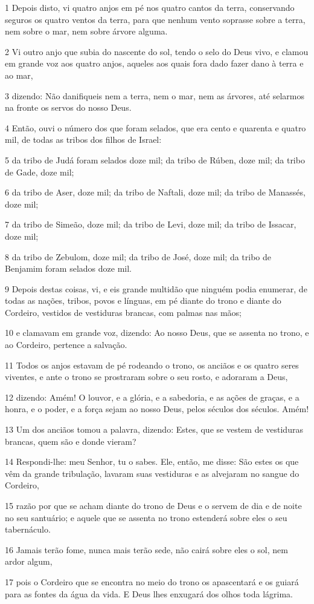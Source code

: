 \par 1 Depois disto, vi quatro anjos em pé nos quatro cantos da terra, conservando seguros os quatro ventos da terra, para que nenhum vento soprasse sobre a terra, nem sobre o mar, nem sobre árvore alguma.
\par 2 Vi outro anjo que subia do nascente do sol, tendo o selo do Deus vivo, e clamou em grande voz aos quatro anjos, aqueles aos quais fora dado fazer dano à terra e ao mar,
\par 3 dizendo: Não danifiqueis nem a terra, nem o mar, nem as árvores, até selarmos na fronte os servos do nosso Deus.
\par 4 Então, ouvi o número dos que foram selados, que era cento e quarenta e quatro mil, de todas as tribos dos filhos de Israel:
\par 5 da tribo de Judá foram selados doze mil; da tribo de Rúben, doze mil; da tribo de Gade, doze mil;
\par 6 da tribo de Aser, doze mil; da tribo de Naftali, doze mil; da tribo de Manassés, doze mil;
\par 7 da tribo de Simeão, doze mil; da tribo de Levi, doze mil; da tribo de Issacar, doze mil;
\par 8 da tribo de Zebulom, doze mil; da tribo de José, doze mil; da tribo de Benjamim foram selados doze mil.
\par 9 Depois destas coisas, vi, e eis grande multidão que ninguém podia enumerar, de todas as nações, tribos, povos e línguas, em pé diante do trono e diante do Cordeiro, vestidos de vestiduras brancas, com palmas nas mãos;
\par 10 e clamavam em grande voz, dizendo: Ao nosso Deus, que se assenta no trono, e ao Cordeiro, pertence a salvação.
\par 11 Todos os anjos estavam de pé rodeando o trono, os anciãos e os quatro seres viventes, e ante o trono se prostraram sobre o seu rosto, e adoraram a Deus,
\par 12 dizendo: Amém! O louvor, e a glória, e a sabedoria, e as ações de graças, e a honra, e o poder, e a força sejam ao nosso Deus, pelos séculos dos séculos. Amém!
\par 13 Um dos anciãos tomou a palavra, dizendo: Estes, que se vestem de vestiduras brancas, quem são e donde vieram?
\par 14 Respondi-lhe: meu Senhor, tu o sabes. Ele, então, me disse: São estes os que vêm da grande tribulação, lavaram suas vestiduras e as alvejaram no sangue do Cordeiro,
\par 15 razão por que se acham diante do trono de Deus e o servem de dia e de noite no seu santuário; e aquele que se assenta no trono estenderá sobre eles o seu tabernáculo.
\par 16 Jamais terão fome, nunca mais terão sede, não cairá sobre eles o sol, nem ardor algum,
\par 17 pois o Cordeiro que se encontra no meio do trono os apascentará e os guiará para as fontes da água da vida. E Deus lhes enxugará dos olhos toda lágrima.

